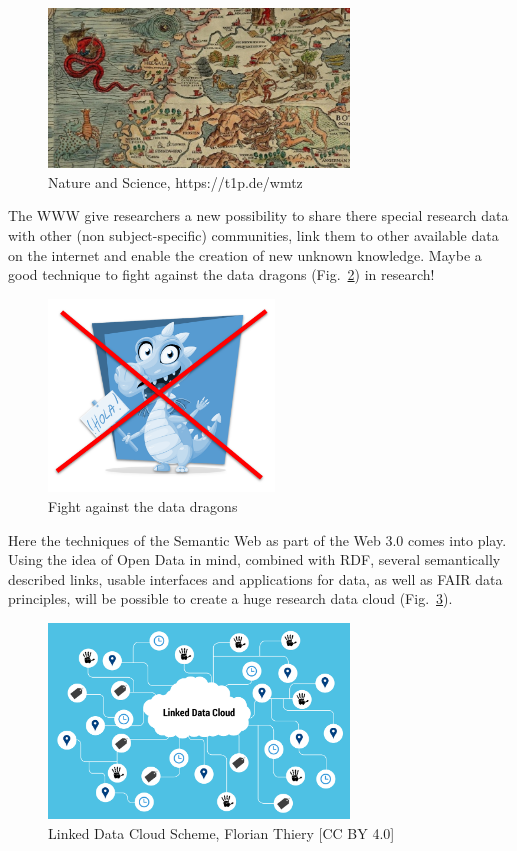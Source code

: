 \documentclass[twocolumn]{autart}
\begin{document}
\begin{figure}[!htb]
\begin{center}
\includegraphics[width=8cm]{Beyond-This-here-be-no-dragons-blog-copy-881x467.jpg}
\caption{Nature and Science, https://t1p.de/wmtz}
\label{map}
\end{center}
\end{figure}

The WWW give researchers a new possibility to share there special research data with other (non subject-specific) communities, link them to other available data on the internet and enable the creation of new unknown knowledge. Maybe a good technique to fight against the data dragons (Fig.~\ref{datadragon}) in research!

\begin{figure}[!htb]
\begin{center}
\includegraphics[width=6cm]{datadragon.png}
\caption{Fight against the data dragons}
\label{datadragon}
\end{center}
\end{figure}

Here the techniques of the Semantic Web\cite{BernersLee2001TheSW} as part of the Web 3.0 comes into play. Using the idea of Open Data in mind, combined with RDF, several semantically described links, usable interfaces and applications for data, as well as FAIR data principles, will be possible to create a huge research data cloud (Fig.~\ref{ldc}).

\begin{figure}[!htb]
\begin{center}
\includegraphics[width=8cm]{ldc.png}
\caption{Linked Data Cloud Scheme, Florian Thiery [CC BY 4.0]}
\label{ldc}
\end{center}
\end{figure}
\end{document}
